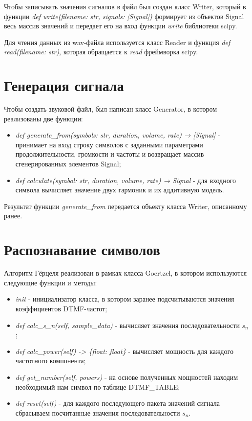 Чтобы записывать значения сигналов в файл был создан класс Writer, который в функции \textit{def write(filename: str, signals: [Signal])} формирует из объектов Signal весь массив значений и передает его на вход функции \textit{write} библиотеки scipy.

Для чтения данных из wav-файла используется класс Reader и функция \textit{def read(filename: str)}, которая обращается к \textit{read} фреймворка scipy.

\section{Генерация сигнала}

Чтобы создать звуковой файл, был написан класс Generator, в котором реализованы две функции:

\begin{itemize}
	\item \textit{def generate\_from(symbols: str, duration, volume, rate) → [Signal]} - принимает на вход строку символов с заданными параметрами продолжительности, громкости и частоты и возвращает массив сгенерированных элементов Signal;
	\item \textit{def calculate(symbol: str, duration, volume, rate) → Signal} - для входного символа вычисляет значение двух гармоник и их аддитивную модель.
\end{itemize}

Результат функции \textit{generate\_from} передается объекту класса Writer, описанному ранее.

\section{Распознавание символов}

Алгоритм Гёрцеля реализован в рамках класса Goertzel, в котором используются следующие функции и методы:

\begin{itemize}
	\item \textit{init} - инициализатор класса, в котором заранее подсчитываются значения коэффициентов DTMF-частот;
	\item \textit{def calc\_s\_n(self, sample\_data)} - вычисляет значения последовательности $s_n$;
	\item \textit{def calc\_power(self) -> \{float: float\}} - вычисляет мощность для каждого частотного компонента;
	\item \textit{def get\_number(self, powers)} - на основе полученных мощностей находим необходимый нам символ по таблице DTMF\_TABLE;
	\item \textit{def reset(self)} - для каждого последующего пакета значений сигнала сбрасываем посчитанные значения последовательности $s_n$.
\end{itemize}

